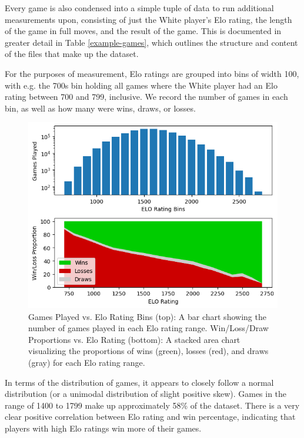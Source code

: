 \documentclass[conference]{IEEEtran}
\begin{document}
Every game is also condensed into a simple tuple of data to run additional measurements upon, consisting of just the White player's Elo rating, the length of the game in full moves, and the result of the game. This is documented in greater detail in Table \ref{example-games}, which outlines the structure and content of the files that make up the dataset.

For the purposes of measurement, Elo ratings are grouped into bins of width 100, with e.g. the 700s bin holding all games where the White player had an Elo rating between 700 and 799, inclusive. We record the number of games in each bin, as well as how many were wins, draws, or losses.

\begin{figure}[htbp]
\centerline{\includegraphics[scale=0.5]{Distribution and Win-Loss Proportion by Elo.png}}
\caption{Games Played vs. Elo Rating Bins (top): A bar chart showing the number of games played in each Elo rating range.
Win/Loss/Draw Proportions vs. Elo Rating (bottom): A stacked area chart visualizing the proportions of wins (green), losses (red), and draws (gray) for each Elo rating range.}
\label{fig}
\end{figure}

In terms of the distribution of games, it appears to closely follow a normal distribution (or a unimodal distribution of slight positive skew). Games in the range of 1400 to 1799 make up approximately 58\% of the dataset. There is a very clear positive correlation between Elo rating and win percentage, indicating that players with high Elo ratings win more of their games.
\end{document}
